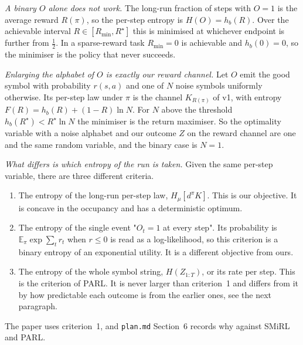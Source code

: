 \documentclass[10pt]{article}
\theoremstyle{plain}
\newcommand{\Hmu}[1]{H_\mu\!\left[#1\right]}
\newcommand{\occ}{d^{\pi}}
\newcommand{\E}{\mathbb E}
\begin{document}
\emph{A binary $O$ alone does not work.}
The long-run fraction of steps with $O = 1$ is the average reward $R(\pi)$, so the per-step entropy is $H(O) = h_b(R)$.
Over the achievable interval $R \in [R_{\min}, R^\star]$ this is minimised at whichever endpoint is further from $\tfrac12$.
In a sparse-reward task $R_{\min} = 0$ is achievable and $h_b(0) = 0$, so the minimiser is the policy that never succeeds.

\emph{Enlarging the alphabet of $O$ is exactly our reward channel.}
Let $O$ emit the good symbol with probability $r(s,a)$ and one of $N$ noise symbols uniformly otherwise.
Its per-step law under $\pi$ is the channel $K_{R(\pi)}$ of v1, with entropy $F(R) = h_b(R) + (1-R)\ln N$.
For $N$ above the threshold $h_b(R^\star) < R^\star \ln N$ the minimiser is the return maximiser.
So the optimality variable with a noise alphabet and our outcome $Z$ on the reward channel are one and the same random variable, and the binary case is $N = 1$.

\emph{What differs is which entropy of the run is taken.}
Given the same per-step variable, there are three different criteria.
\begin{enumerate}
\item The entropy of the long-run per-step law, $\Hmu{\occ K}$. This is our objective. It is concave in the occupancy and has a deterministic optimum.
\item The entropy of the single event "$O_t = 1$ at every step". Its probability is $\E_\pi \exp\sum_t r_t$ when $r \le 0$ is read as a log-likelihood, so this criterion is a binary entropy of an exponential utility. It is a different objective from ours.
\item The entropy of the whole symbol string, $H(Z_{1:T})$, or its rate per step. This is the criterion of PARL. It is never larger than criterion~1 and differs from it by how predictable each outcome is from the earlier ones, see the next paragraph.
\end{enumerate}
The paper uses criterion~1, and \texttt{plan.md} Section~6 records why against SMiRL and PARL.
\end{document}
